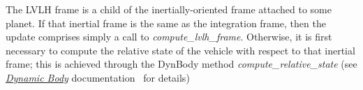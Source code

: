 \begin{itemize}
\begin{enumerate}
The LVLH frame is a child of the inertially-oriented frame attached to some planet.  If that inertial frame is the same as the integration frame, then the update comprises simply a call to \textit{compute\_lvlh\_frame}.  Otherwise, it is first necessary to compute the relative state of the vehicle with respect to that inertial frame; this is achieved through the DynBody method \textit{compute\_relative\_state} (see \href{file:\JEODHOME/models/dynamics/dyn\_body/docs/dyn\_body.pdf}{\em Dynamic Body} documentation~\cite{dynenv:REFFRAMES} for details)

\end{enumerate}
\end{itemize}
